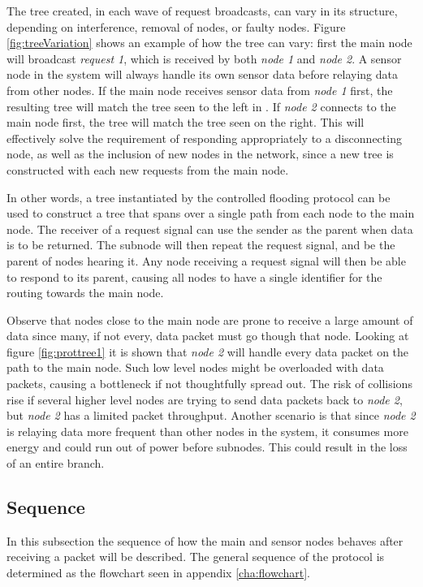 The tree created, in each wave of request broadcasts, can vary in its structure, depending on interference, removal of nodes, or faulty nodes. Figure \ref{fig:treeVariation} shows an example of how the tree can vary: first the main node will broadcast \textit{request 1}, which is received by both \textit{node 1} and \textit{node 2}. A sensor node in the system will always handle its own sensor data before relaying data from other nodes. If the main node receives sensor data from \textit{node 1} first, the resulting tree will match the tree seen to the left in . If \textit{node 2} connects to the main node first, the tree will match the tree seen on the right.
This will effectively solve the requirement of responding appropriately to a disconnecting node, as well as the inclusion of new nodes in the network, since a new tree is constructed with each new requests from the main node.

In other words, a tree instantiated by the controlled flooding protocol can be used to construct a tree that spans over a single path from each node to the main node.
The receiver of a request signal can use the sender as the parent when data is to be returned.
The subnode will then repeat the request signal, and be the parent of nodes hearing it.
Any node receiving a request signal will then be able to respond to its parent, causing all nodes to have a single identifier for the routing towards the main node.

Observe that nodes close to the main node are prone to receive a large amount of data since many, if not every, data packet must go though that node. Looking at figure \ref{fig:prottree1} it is shown that \textit{node 2} will handle every data packet on the path to the main node. Such low level nodes might be overloaded with data packets, causing a bottleneck if not thoughtfully spread out. The risk of collisions rise if several higher level nodes are trying to send data packets back to \textit{node 2}, but \textit{node 2} has a limited packet throughput. Another scenario is that since \textit{node 2} is relaying data more frequent than other nodes in the system, it consumes more energy and could  run out of power before subnodes. This could result in the loss of an entire branch.

\subsection{Sequence}
In this subsection the sequence of how the main and sensor nodes behaves after receiving a packet will be described.
The general sequence of the protocol is determined as the flowchart seen in appendix \ref{cha:flowchart}.

